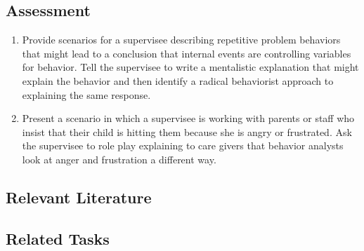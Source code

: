 \subsection{Assessment}
\begin{enumerate}
\item Provide scenarios for a supervisee describing repetitive problem behaviors that might lead to a conclusion that internal events are controlling variables for behavior. Tell the supervisee to write a mentalistic explanation that might explain the behavior and then identify a radical behaviorist approach to explaining the same response.
\item Present a scenario in which a supervisee is working with parents or staff who insist that their child is hitting them because she is angry or frustrated. Ask the supervisee to role play explaining to care givers that behavior analysts look at anger and frustration a different way. 
%
\end{enumerate}
%
\subsection{Relevant Literature}
\begin{refsection}
\nocite{cooper2007applied,
        skinner1953science}
\printbibliography[heading=none]
\end{refsection}
%
\subsection{Related Tasks}
\fourbOne{}\\
\fourgFour{}\\
\fourgFive{}\\
\fouriOne{}\\
\fouriTwo{}\\
\fourkTwo{}\\
\fourFKOne{}\\
\fourFKThree{}\\
\fourFKSeven{}\\
